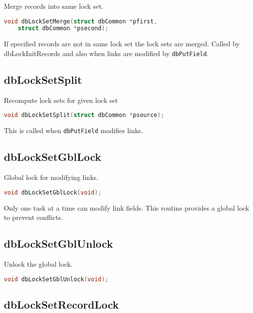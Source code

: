 Merge records into same lock set.

\begin{lstlisting}[language=C]
void dbLockSetMerge(struct dbCommon *pfirst,
    struct dbCommon *psecond);
\end{lstlisting}

If specified records are not in same lock set the lock sets are merged.
Called by dbLockInitRecords and also when links are modified by \verb|dbPutField|.

\subsection{dbLockSetSplit}

Recompute lock sets for given lock set

\begin{lstlisting}[language=C]
void dbLockSetSplit(struct dbCommon *psource);
\end{lstlisting}

This is called when \verb|dbPutField| modifies links.

\subsection{dbLockSetGblLock}

Global lock for modifying links.

\begin{lstlisting}[language=C]
void dbLockSetGblLock(void);
\end{lstlisting}

Only one task at a time can modify link fields.
This routine provides a global lock to prevent conflicts.

\subsection{dbLockSetGblUnlock}

Unlock the global lock.

\begin{lstlisting}[language=C]
void dbLockSetGblUnlock(void);
\end{lstlisting}

\subsection{dbLockSetRecordLock}

